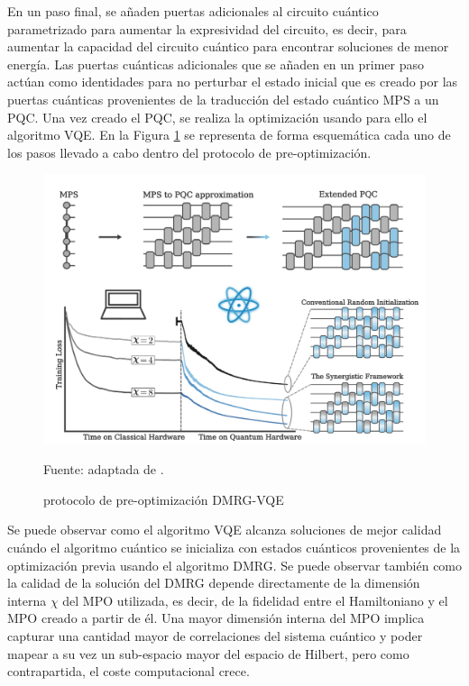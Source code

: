 \newpage

En un paso final, se añaden puertas adicionales al circuito cuántico parametrizado para aumentar la expresividad del circuito, es decir, para aumentar la capacidad del circuito cuántico para encontrar soluciones de menor energía. Las puertas cuánticas adicionales que se añaden en un primer paso actúan como identidades para no perturbar el estado inicial que es creado por las puertas cuánticas provenientes de la traducción del estado cuántico MPS a un \mbox{PQC}. Una vez creado el \mbox{PQC}, se realiza la optimización usando para ello el algoritmo VQE. En la Figura \ref{fig:prep_dmrg} se representa de forma esquemática cada uno de los pasos llevado a cabo dentro del protocolo de pre-optimización.

\begin{figure}[!h]
    \centering
    \includegraphics[scale = 0.6]{img/05-preprocesado_DMRG_VQE.png}
    \caption{protocolo de pre-optimización DMRG-VQE}
    Fuente: adaptada de \cite{manuel}.
    \label{fig:prep_dmrg}
\end{figure}

Se puede observar como el algoritmo VQE alcanza soluciones de mejor calidad cuándo el algoritmo cuántico se inicializa con estados cuánticos provenientes de la optimización previa usando el algoritmo DMRG. Se puede observar también como la calidad de la solución del DMRG depende directamente de la dimensión interna $\chi$ del MPO utilizada, es decir, de la fidelidad entre el Hamiltoniano y el MPO creado a partir de él. Una mayor dimensión interna del MPO implica capturar una cantidad mayor de correlaciones del sistema cuántico y poder mapear a su vez un sub-espacio mayor del espacio de Hilbert, pero como contrapartida, el coste computacional crece.

